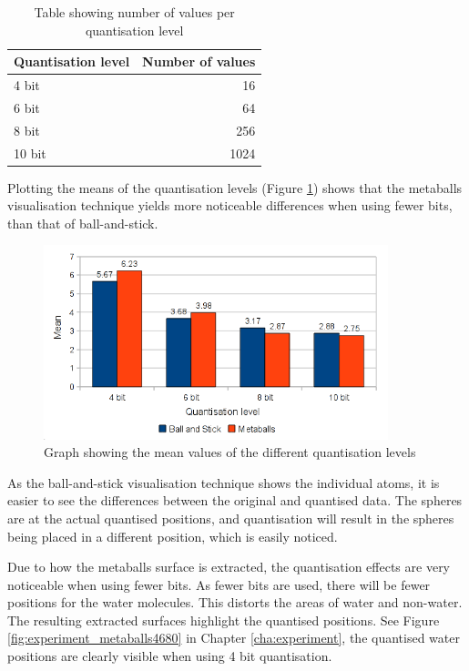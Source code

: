 \begin{table}
  \begin{tabular}{ | l | r | }
  \hline
  Quantisation level & Number of values  \\ \hline
  4 bit              &               16  \\ \hline
  6 bit              &               64  \\ \hline
  8 bit              &              256  \\ \hline
  10 bit             &             1024  \\ \hline
  \end{tabular}
  \caption{Table showing number of values per quantisation level}
  \label{tab:results_bitvalues}
\end{table}

Plotting the means of the quantisation levels (Figure
\ref{fig:results_bm_means}) shows that the metaballs visualisation technique
yields more noticeable differences when using fewer bits, than that of
ball-and-stick.

\begin{figure}
  \begin{center}
    \includegraphics[width=100mm]{bm_means}
  \end{center}
  \caption{Graph showing the mean values of the different quantisation levels}
  \label{fig:results_bm_means}
\end{figure}

As the ball-and-stick visualisation technique shows the individual atoms, it is
easier to see the differences between the original and quantised data. The
spheres are at the actual quantised positions, and quantisation will result in
the spheres being placed in a different position, which is easily noticed.

Due to how the metaballs surface is extracted, the quantisation effects are
very noticeable when using fewer bits. As fewer bits are used, there will be
fewer positions for the water molecules. This distorts the areas of water and
non-water. The resulting extracted surfaces highlight the quantised positions.
See Figure \ref{fig:experiment_metaballs4680} in Chapter \ref{cha:experiment},
the quantised water positions are clearly visible when using 4 bit
quantisation.


